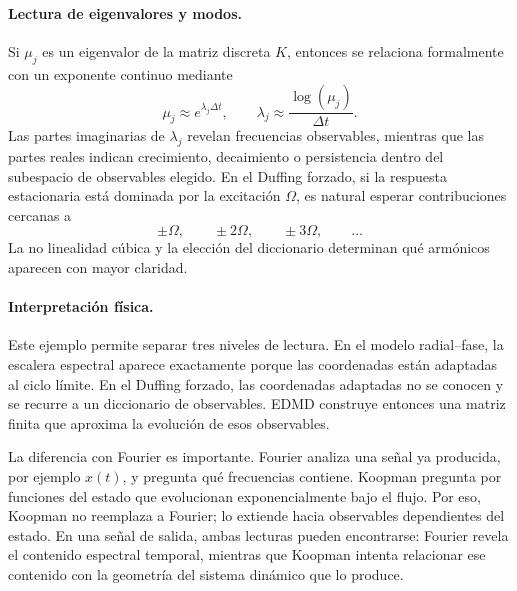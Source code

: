 \paragraph{Lectura de eigenvalores y modos.}
Si \(\mu_j\) es un eigenvalor de la matriz discreta \(K\), entonces se relaciona formalmente con un exponente continuo mediante
\begin{equation}
\mu_j\approx e^{\lambda_j\Delta t},
\qquad
\lambda_j\approx \frac{\log(\mu_j)}{\Delta t}.
\label{eq:Koopman_duffing_discrete_to_continuous}
\end{equation}
Las partes imaginarias de \(\lambda_j\) revelan frecuencias observables, mientras que las partes reales indican crecimiento, decaimiento o persistencia dentro del subespacio de observables elegido. En el Duffing forzado, si la respuesta estacionaria está dominada por la excitación \(\Omega\), es natural esperar contribuciones cercanas a
\begin{equation}
\pm \Omega,
\qquad
\pm 2\Omega,
\qquad
\pm 3\Omega,
\qquad \ldots
\end{equation}
La no linealidad cúbica y la elección del diccionario determinan qué armónicos aparecen con mayor claridad.

\paragraph{Interpretación física.}
Este ejemplo permite separar tres niveles de lectura. En el modelo radial--fase, la escalera espectral aparece exactamente porque las coordenadas están adaptadas al ciclo límite. En el Duffing forzado, las coordenadas adaptadas no se conocen y se recurre a un diccionario de observables. EDMD construye entonces una matriz finita que aproxima la evolución de esos observables.

La diferencia con Fourier es importante. Fourier analiza una señal ya producida, por ejemplo \(x(t)\), y pregunta qué frecuencias contiene. Koopman pregunta por funciones del estado que evolucionan exponencialmente bajo el flujo. Por eso, Koopman no reemplaza a Fourier; lo extiende hacia observables dependientes del estado. En una señal de salida, ambas lecturas pueden encontrarse: Fourier revela el contenido espectral temporal, mientras que Koopman intenta relacionar ese contenido con la geometría del sistema dinámico que lo produce.


